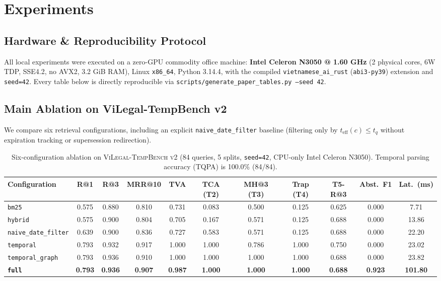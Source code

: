 \documentclass[11pt,a4paper]{article}
\begin{document}
\section{Experiments}

\subsection{Hardware & Reproducibility Protocol}
All local experiments were executed on a zero-GPU commodity office machine: \textbf{Intel Celeron N3050 @ 1.60 GHz} (2 physical cores, 6W TDP, SSE4.2, no AVX2, 3.2 GiB RAM), Linux \texttt{x86\_64}, Python 3.14.4, with the compiled \texttt{vietnamese\_ai\_rust} (\texttt{abi3-py39}) extension and \texttt{seed=42}. Every table below is directly reproducible via \texttt{scripts/generate\_paper\_tables.py --seed 42}.

\subsection{Main Ablation on ViLegal-TempBench v2}
We compare six retrieval configurations, including an explicit \texttt{naive\_date\_filter} baseline (filtering only by $t_{\mathrm{eff}}(c) \le t_q$ without expiration tracking or supersession redirection).

\begin{table}[t]
\centering
\small
\caption{Six-configuration ablation on \textsc{ViLegal-TempBench v2} (84 queries, 5 splits, \texttt{seed=42}, CPU-only Intel Celeron N3050). Temporal parsing accuracy (TQPA) is 100.0\% (84/84).}
\label{tab:vilegal_tempbench_v2}
\begin{tabular}{lcccccccccc}
\toprule
Configuration & R@1 & R@3 & MRR@10 & TVA & TCA (T2) & MH@3 (T3) & Trap (T4) & T5-R@3 & Abst.\ F1 & Lat.\ (ms) \\
\midrule
\texttt{bm25} & 0.575 & 0.880 & 0.810 & 0.731 & 0.083 & 0.500 & 0.125 & 0.625 & 0.000 & 7.71 \\
\texttt{hybrid} & 0.575 & 0.900 & 0.804 & 0.705 & 0.167 & 0.571 & 0.125 & 0.688 & 0.000 & 13.86 \\
\texttt{naive\_date\_filter} & 0.639 & 0.900 & 0.836 & 0.727 & 0.583 & 0.571 & 0.125 & 0.688 & 0.000 & 22.20 \\
\texttt{temporal} & 0.793 & 0.932 & 0.917 & 1.000 & 1.000 & 0.786 & 1.000 & 0.750 & 0.000 & 23.02 \\
\texttt{temporal\_graph} & 0.793 & 0.936 & 0.910 & 1.000 & 1.000 & 1.000 & 1.000 & 0.688 & 0.000 & 23.82 \\
\textbf{\texttt{full}} & \textbf{0.793} & \textbf{0.936} & \textbf{0.907} & \textbf{0.987} & \textbf{1.000} & \textbf{1.000} & \textbf{1.000} & \textbf{0.688} & \textbf{0.923} & \textbf{101.80} \\
\bottomrule
\end{tabular}
\end{table}
\end{document}
